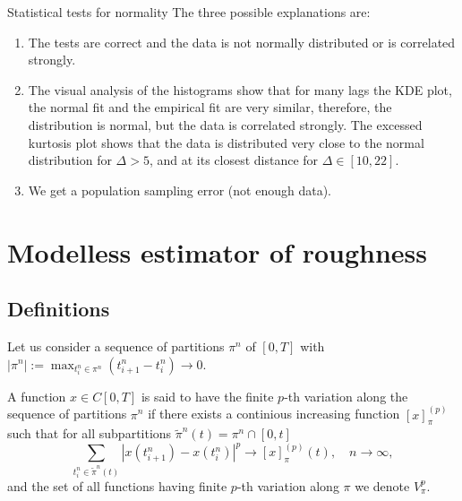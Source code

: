             \begin{frame}{Statistical tests for normality}
                The three possible explanations are:
                \begin{enumerate}
                    \item The tests are correct and the data is not normally distributed or is correlated strongly.
                    \item The visual analysis of the histograms show that for many lags the KDE plot, the normal fit and 
                    the empirical fit are very similar, therefore, the distribution is normal, but the data is 
                    correlated strongly. The excessed kurtosis plot shows that the data is distributed very close to the normal
                    distribution for $\Delta > 5$, and at its closest distance for $\Delta \in [10, 22]$.
                    \item We get a population sampling error (not enough data).
                \end{enumerate} 
            \end{frame}

    \section{Modelless estimator of roughness}
        \subsection{Definitions}
            \begin{frame}{}
                Let us consider a sequence of partitions $\pi^n$ of $\left[0, T\right]$ with 
                $\left|\pi^n\right|:=\max_{t_i^n \in \pi^n} (t_{i+1}^n - t_i^n) \to 0$. 
                \begin{definition}
                    A function $x \in C[0, T]$ is said to have the finite $p$-th variation along the sequence of partitions $\pi^n$ 
                    if there exists a continious increasing function $\left[x\right]_{\pi}^{(p)}$ such that for all subpartitions $\tilde\pi^n(t) = \pi^n \cap [0, t]$
                    \begin{equation}
                        \sum_{t_i^n \in \tilde\pi^n(t)} \left|x(t_{i+1}^n) - x(t_i^n)\right|^p \to \left[x\right]_{\pi}^{(p)}(t), \quad n\to \infty,
                    \end{equation}
                    and the set of all functions having finite $p$-th variation along $\pi$ we denote $V_\pi^p$.
                \end{definition}
            \end{frame}

